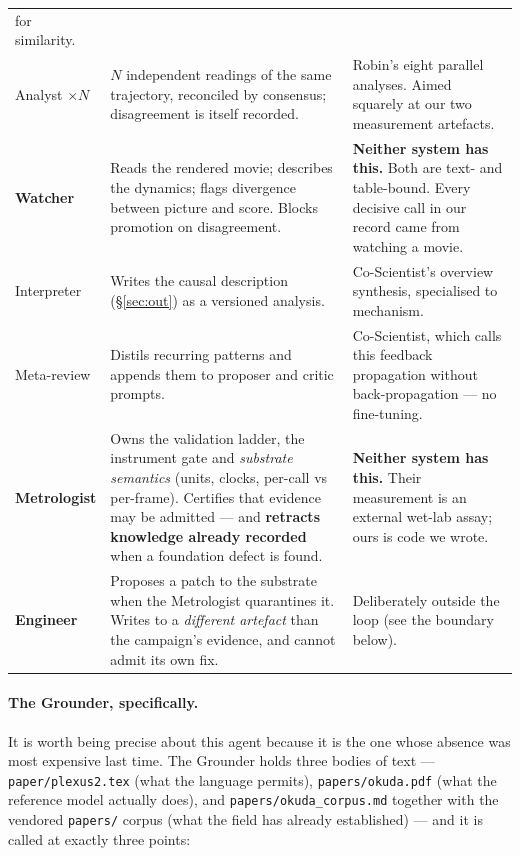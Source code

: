 \documentclass[11pt]{article}
\newcommand{\code}[1]{\texttt{#1}}
\begin{document}
\begin{center}
\begin{tabular}{@{}p{2.2cm}p{6.5cm}p{5.6cm}@{}}
for similarity. \\
Analyst $\times N$ & $N$ independent readings of the same trajectory, reconciled by consensus;
disagreement is itself recorded. & Robin's eight parallel analyses. Aimed squarely at our two
measurement artefacts. \\
\textbf{Watcher} & Reads the rendered movie; describes the dynamics; flags divergence between
picture and score. Blocks promotion on disagreement. & \textbf{Neither system has this.} Both are
text- and table-bound. Every decisive call in our record came from watching a movie. \\
Interpreter & Writes the causal description (\S\ref{sec:out}) as a versioned analysis. &
Co-Scientist's overview synthesis, specialised to mechanism. \\
Meta-review & Distils recurring patterns and appends them to proposer and critic prompts. &
Co-Scientist, which calls this feedback propagation without back-propagation --- no fine-tuning. \\
\textbf{Metrologist} & Owns the validation ladder, the instrument gate and \emph{substrate
semantics} (units, clocks, per-call vs per-frame). Certifies that evidence may be admitted --- and
\textbf{retracts knowledge already recorded} when a foundation defect is found. & \textbf{Neither
system has this.} Their measurement is an external wet-lab assay; ours is code we wrote. \\
\textbf{Engineer} & Proposes a patch to the substrate when the Metrologist quarantines it. Writes
to a \emph{different artefact} than the campaign's evidence, and cannot admit its own fix. &
Deliberately outside the loop (see the boundary below). \\
\bottomrule
\end{tabular}
\end{center}

\paragraph{The Grounder, specifically.} It is worth being precise about this agent because it
is the one whose absence was most expensive last time. The Grounder holds three bodies of text ---
\code{paper/plexus2.tex} (what the language permits), \code{papers/okuda.pdf} (what the reference
model actually does), and \code{papers/okuda\_corpus.md} together with the vendored
\code{papers/} corpus (what the field has already established) --- and it is called at exactly
three points:
\end{document}
